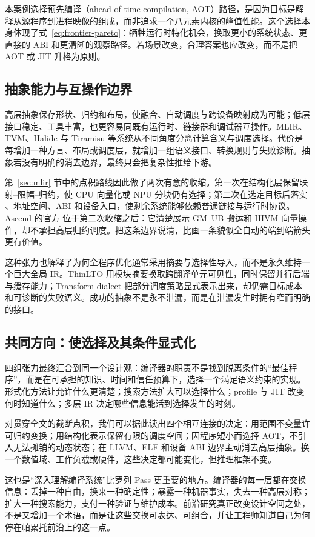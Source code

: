 本案例选择预先编译（ahead-of-time compilation, AOT）路径，是因为目标是解释从源程序到进程映像的组成，而非追求一个八元素内核的峰值性能。这个选择本身体现了式~\eqref{eq:frontier-pareto}：牺牲运行时特化机会，换取更小的系统状态、更直接的 ABI 和更清晰的观察路径。若场景改变，合理答案也应改变，而不是把 AOT 或 JIT 升格为原则。

\subsection{抽象能力与互操作边界}

高层抽象保存形状、归约和布局，使融合、自动调度与跨设备映射成为可能；低层接口稳定、工具丰富，也更容易同既有运行时、链接器和调试器互操作。MLIR、TVM、Halide 与 Tiramisu 等系统从不同角度分离计算含义与调度选择\cite{adv-mlir-cgo,adv-tvm,adv-halide,adv-tiramisu}。代价是每增加一种方言、布局或调度层，就增加一组语义接口、转换规则与失败诊断。抽象若没有明确的消去边界，最终只会把复杂性推给下游。

第~\ref{sec:mlir} 节中的点积路线因此做了两次有意的收缩。第一次在结构化层保留映射--限幅--归约，使 CPU 向量化或 NPU 分块仍有选择；第二次在选定目标后落实 、地址空间、ABI 和设备入口，使剩余系统能够依赖普通链接与运行时协议。Ascend 的官方  位于第二次收缩之后：它清楚展示 GM--UB 搬运和 HIVM 向量操作，却不承担高层归约调度。把这条边界说清，比画一条貌似全自动的端到端箭头更有价值。

这种张力也解释了为何全程序优化通常采用摘要与选择性导入，而不是永久维持一个巨大全局 IR。ThinLTO 用模块摘要换取跨翻译单元可见性，同时保留并行后端与缓存能力\cite{adv-thinlto-paper,adv-thinlto-doc}；Transform dialect 把部分调度策略显式表示出来，却仍需目标成本和可诊断的失败语义\cite{adv-transform-dialect}。成功的抽象不是永不泄漏，而是在泄漏发生时拥有窄而明确的接口。

\subsection{共同方向：使选择及其条件显式化}

四组张力最终汇合到同一个设计观：编译器的职责不是找到脱离条件的“最佳程序”，而是在可承担的知识、时间和信任预算下，选择一个满足语义约束的实现。形式化方法让允许什么更清楚；搜索方法扩大可以选择什么；profile 与 JIT 改变何时知道什么；多层 IR 决定哪些信息能活到选择发生的时刻。

对贯穿全文的截断点积，我们可以据此读出四个相互连接的决定：用范围不变量许可归约变换；用结构化表示保留有限的调度空间；因程序短小而选择 AOT，不引入无法摊销的动态状态；在 LLVM、ELF 和设备 ABI 边界主动消去高层抽象。换一个数值域、工作负载或硬件，这些决定都可能变化，但推理框架不变。

这也是“深入理解编译系统”比罗列 Pass 更重要的地方。编译器的每一层都在交换信息：丢掉一种自由，换来一种确定性；暴露一种机器事实，失去一种高层对称；扩大一种搜索能力，支付一种验证与维护成本。前沿研究真正改变设计空间之处，不是又增加一个术语，而是让这些交换可表达、可组合，并让工程师知道自己为何停在帕累托前沿上的这一点。
